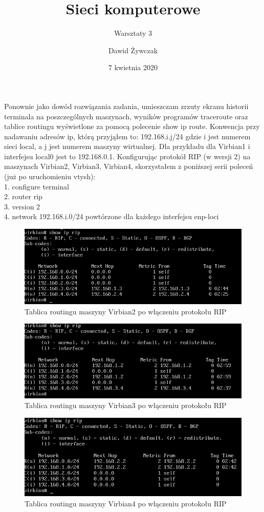 \documentclass[a4paper]{scrartcl}
\title{Sieci komputerowe}
\subtitle{Warsztaty 3}
\author{Dawid Żywczak}
\date{7 kwietnia 2020}
\begin{document}
\maketitle
Ponownie jako dowód rozwiązania zadania, umieszczam zrzuty ekranu historii terminala na poszczególnych maszynach, wyników programów traceroute oraz tablice routingu wyświetlone za pomocą polecenie show ip route. Konwencja przy nadawaniu adresów ip, którą przyjąłem to: 192.168.i.j/24 gdzie i jest numerem sieci local, a j jest numerem maszyny wirtualnej. Dla przykładu dla Virbian1 i interfejsu local0 jest to 192.168.0.1.
Konfigurując protokół RIP (w wersji 2) na maszynach Virbian2, Virbian3, Virbian4, skorzystałem z poniższej serii poleceń (już po uruchomieniu vtysh):\\
1. configure terminal\\
2. router rip\\
3. version 2\\
4. network 192.168.i.0/24 powtórzone dla każdego interfejsu enp-loci\\
\begin{figure}
  \includegraphics[width=\linewidth]{routingvib2.png}
  \caption{Tablica routingu maszyny Virbian2 po włączeniu protokołu RIP}
\end{figure}
\begin{figure}
  \includegraphics[width=\linewidth]{routingvib3.png}
  \caption{Tablica routingu maszyny Virbian3 po włączeniu protokołu RIP}
\end{figure}
\begin{figure}
  \includegraphics[width=\linewidth]{routingvib4.png}
  \caption{Tablica routingu maszyny Virbian4 po włączeniu protokołu RIP}
\end{figure}
\end{document}
